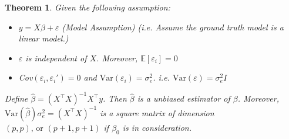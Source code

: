 \documentclass{article}
\theoremstyle{MyNonumberplain}
\theoremstyle{break}
\newcommand{\ve}{\varepsilon}
\newcommand{\ev}{\mathbb{E}}
\newcommand{\var}{\text{Var}}
\newcommand{\T}{^\intercal}
\newcommand{\bt}[1]{\beta_{#1}}
\theoremstyle{break}
\newtheorem{theorem}{Theorem}[section]
\begin{document}
\begin{thmbox}
    \begin{theorem}
        Given the following assumption:

        \begin{itemize}
            \medskip
            \item $y=X\beta+\ve$ (Model Assumption) (i.e. Assume the ground truth model is a linear model.)
            \medskip
            \item $\ve$ is independent of $X$. Moreover, $\ev[\ve_i]=0$
            \medskip
            \item Cov$(\ve_i, \ve_i')=0$ and $\var(\ve_i)=\sigma_e^2$. i.e. $\var(\ve)=\sigma_e^2I$
        \end{itemize}
        \medskip
        Define $\hat{\beta}=(X\T X)^{-1}X\T y$. Then $\hat\beta$ is a unbiased estimator of $\beta$.
        Moreover, $\var(\hat\beta)\sigma_e^2 = (X\T X)^{-1}$ is a square matrix of dimension $(p,p) \text{, or } (p+1,p+1)$ if $\bt{0}$ is in consideration.
    \end{theorem}
\end{thmbox} 
\end{document}
